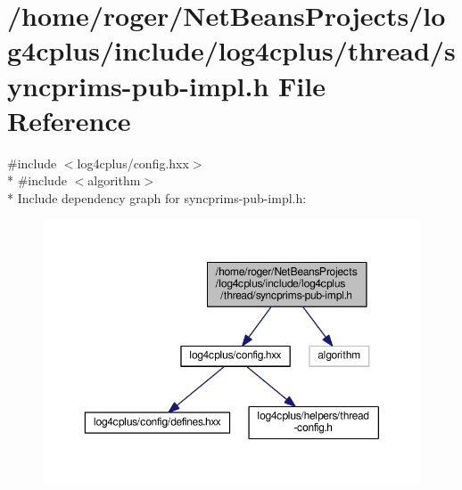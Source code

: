 \hypertarget{syncprims-pub-impl_8h}{\section{/home/roger/\-Net\-Beans\-Projects/log4cplus/include/log4cplus/thread/syncprims-\/pub-\/impl.h File Reference}
\label{syncprims-pub-impl_8h}
}
{\ttfamily \#include $<$log4cplus/config.\-hxx$>$}\\*
{\ttfamily \#include $<$algorithm$>$}\\*
Include dependency graph for syncprims-\/pub-\/impl.h\-:
\nopagebreak
\begin{figure}[H]
\begin{center}
\leavevmode
\includegraphics[width=350pt]{syncprims-pub-impl_8h__incl}
\end{center}
\end{figure}
